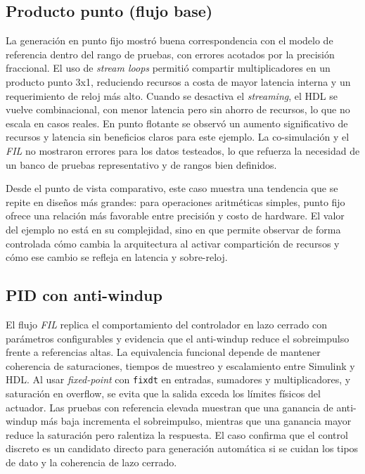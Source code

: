 \subsection{Producto punto (flujo base)}
La generación en punto fijo mostró buena correspondencia con el modelo de referencia dentro del rango de pruebas, con errores acotados por la precisión fraccional. El uso de \textit{stream loops} permitió compartir multiplicadores en un producto punto 3x1, reduciendo recursos a costa de mayor latencia interna y un requerimiento de reloj más alto. Cuando se desactiva el \textit{streaming}, el HDL se vuelve combinacional, con menor latencia pero sin ahorro de recursos, lo que no escala en casos reales. En punto flotante se observó un aumento significativo de recursos y latencia sin beneficios claros para este ejemplo. La co-simulación y el \textit{FIL} no mostraron errores para los datos testeados, lo que refuerza la necesidad de un banco de pruebas representativo y de rangos bien definidos.

Desde el punto de vista comparativo, este caso muestra una tendencia que se repite en diseños más grandes: para operaciones aritméticas simples, punto fijo ofrece una relación más favorable entre precisión y costo de hardware. El valor del ejemplo no está en su complejidad, sino en que permite observar de forma controlada cómo cambia la arquitectura al activar compartición de recursos y cómo ese cambio se refleja en latencia y sobre-reloj.

\subsection{PID con anti-windup}
El flujo \textit{FIL} replica el comportamiento del controlador en lazo cerrado con parámetros configurables y evidencia que el anti-windup reduce el sobreimpulso frente a referencias altas. La equivalencia funcional depende de mantener coherencia de saturaciones, tiempos de muestreo y escalamiento entre Simulink y HDL. Al usar \textit{fixed-point} con \texttt{fixdt} en entradas, sumadores y multiplicadores, y saturación en overflow, se evita que la salida exceda los límites físicos del actuador. Las pruebas con referencia elevada muestran que una ganancia de anti-windup más baja incrementa el sobreimpulso, mientras que una ganancia mayor reduce la saturación pero ralentiza la respuesta. El caso confirma que el control discreto es un candidato directo para generación automática si se cuidan los tipos de dato y la coherencia de lazo cerrado.

